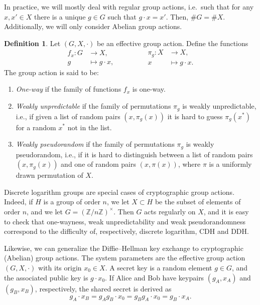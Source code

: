 \documentclass[10pt]{article}
\theoremstyle{plain}
\theoremstyle{definition}
\newtheorem{definition}[theorem]{Definition}
\begin{document}
In practice, we will mostly deal with regular group actions, i.e.\
such that for any $x, x' ∈ X$ there is a unique $g ∈ G$ such that
$g · x = x'$. %
Then, $\#G = \#X$. %
Additionally, we will only consider Abelian group actions.

\begin{definition}
  Let $(G,X,·)$ be an effective group action. %
  Define the functions
  \begin{equation*}
    \begin{aligned}
      f_x : G &\to X,\\
      g &\mapsto g·x,
    \end{aligned}
    \qquad\qquad
    \begin{aligned}
      \pi_g : X &\to X,\\
      x &\mapsto g·x.
    \end{aligned}
  \end{equation*}
  The group action is said to be:
  \begin{enumerate}
  \item \emph{One-way} if the family of functions $f_x$ is one-way.
  \item \emph{Weakly unpredictable} if the family of permutations
    $\pi_g$ is weakly unpredictable, i.e., if given a list of random
    pairs $(x,\pi_g(x))$ it is hard to guess $\pi_g(x^*)$ for a random
    $x^*$ not in the list.
  \item \emph{Weakly pseudorandom} if the family of permutations
    $\pi_g$ is weakly pseudorandom, i.e., if it is hard to distinguish
    between a list of random pairs $(x,\pi_g(x))$ and one of random
    pairs $(x,\pi(x))$, where $\pi$ is a uniformly drawn permutation
    of $X$.
  \end{enumerate}
\end{definition}

Discrete logarithm groups are special cases of cryptographic group
actions. %
Indeed, if $H$ is a group of order $n$, we let $X⊂H$ be the subset of
elements of order $n$, and we let $G = (ℤ/nℤ)^\times$. %
Then $G$ acts regularly on $X$, and it is easy to check that
one-wayness, weak unpredictability and weak pseudorandomness
correspond to the difficulty of, respectively, discrete logarithm, CDH
and DDH.

Likewise, we can generalize the Diffie--Hellman key exchange to
cryptographic (Abelian) group actions. %
The system parameters are the effective group action $(G,X,·)$ with
its origin $x_0∈X$. %
A secret key is a random element $g∈G$, and the associated public key
is $g·x_0$. %
If Alice and Bob have keypairs $(g_A,x_A)$ and $(g_B,x_B)$,
respectively, the shared secret is derived as
\begin{equation*}
  g_A·x_B = g_Ag_B· x_0 = g_Bg_A·x_0 = g_B·x_A.
\end{equation*}
\end{document}
